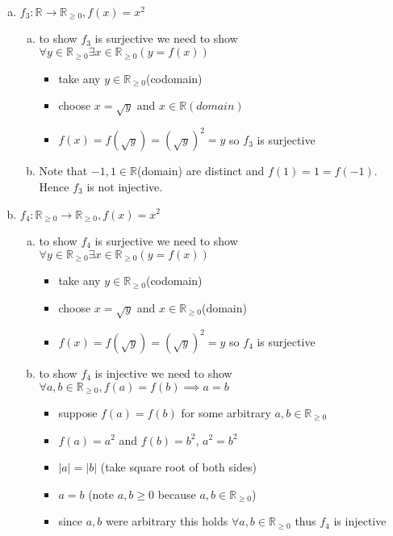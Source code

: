 \documentclass[12pt]{article}
\begin{document}
\begin{enumerate}[a)]
    \item $f_{3} : \mathbb{R} \rightarrow \mathbb{R}_{\geq 0} , f(x) =x ^2$
    \begin{enumerate}[a)]
        \item to show $f_{3}$ is surjective we need to show $\forall y \in \mathbb{R}_{\geq 0} \exists x \in \mathbb{R}_{\geq 0} (y = f(x))$
        \begin{itemize}
            \item take any $y \in \mathbb{R}_{\geq 0}$(codomain)
            \item choose $x=\sqrt{y}$ and $x \in \mathbb{R}(domain)$
            \item $f(x) = f(\sqrt{y}) = (\sqrt{y})^2 = y$ so $f_{3}$ is surjective
        \end{itemize} 
        \item Note that $-1,1\in\mathbb{R}$(domain) are distinct and $f(1) = 1 = f(-1)$. Hence $f_{3}$ is not injective.
    \end{enumerate}
    \item $f_{4} : \mathbb{R}_{\geq 0} \rightarrow \mathbb{R}_{\geq 0} , f(x) =x ^2$
    \begin{enumerate}[a)]
        \item to show $f_{4}$ is surjective we need to show $\forall y \in \mathbb{R}_{\geq 0} \exists x \in \mathbb{R}_{\geq 0} (y = f(x))$
        \begin{itemize}
            \item take any $y \in \mathbb{R}_{\geq 0}$(codomain)
            \item choose $x=\sqrt{y}$ and $x \in \mathbb{R}_{\geq 0}$(domain)
            \item $f(x) = f(\sqrt{y}) = (\sqrt{y})^2 = y$ so $f_{4}$ is surjective
        \end{itemize}
        \item to show $f_{4}$ is injective we need to show $\forall a,b \in\mathbb{R}_{\geq 0} , f(a) = f(b) \implies a=b$
        \begin{itemize}
            \item suppose $f(a) = f(b)$ for some arbitrary $a,b \in \mathbb{R}_{\geq 0} $
            \item $f(a) = a^2 $ and $f(b) = b^2 $, $a^2 = b^2$
            \item $|a| = |b|$  (take square root of both sides)
            \item $a=b$ (note $a,b \geq 0$ because $a,b \in \mathbb{R}_{\geq 0}$)
            \item since $a,b$ were arbitrary this holds $\forall a,b \in \mathbb{R}_{\geq 0}$ thus $f_{4}$ is injective
        \end{itemize}
    \end{enumerate}
\end{enumerate}
\end{document}
